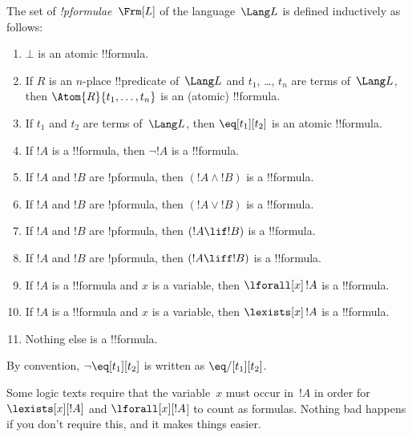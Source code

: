 \documentclass[../../include/open-logic-section]{subfiles}
\begin{document}
\begin{defn}[Formula]
The set of \emph{!p{formulae}}~$\Frm[L]$ of the language~$\Lang L$
is defined inductively as follows:
\begin{enumerate}
\item $\bot$ is an atomic !!{formula}.
\item If $R$ is an $n$-place !!{predicate} of~$\Lang L$ and $t_1$, \dots,
  $t_n$ are terms of~$\Lang L$, then $\Atom{R}{t_1,\ldots, t_n}$ is an
  (atomic) !!{formula}.
\item If $t_1$ and $t_2$ are terms of~$\Lang L$, then $\eq[t_1][t_2]$
  is an atomic !!{formula}.
\item If $!A$ is a !!{formula}, then $\lnot !A$ is a !!{formula}.
\item If $!A$ and $!B$ are !p{formula}, then $(!A \land !B)$ is a !!{formula}.
\item If $!A$ and $!B$ are !p{formula}, then $(!A \lor !B)$ is a !!{formula}.
\item If $!A$ and $!B$ are !p{formula}, then $(!A \lif !B)$ is a !!{formula}.
\item If $!A$ and $!B$ are !p{formula}, then $(!A \liff !B)$ is a !!{formula}.
\item If $!A$ is a !!{formula} and $x$ is a variable, then $\lforall[x]\,
  !A$ is a !!{formula}.
\item If $!A$ is a !!{formula} and $x$ is a variable, then $\lexists[x]\,
  !A$ is a !!{formula}.
\item Nothing else is a !!{formula}.
\end{enumerate}
\end{defn}

\begin{wordy}
By convention, $\lnot \eq[t_1][t_2]$ is written as $\eq/[t_1][t_2]$.
\end{wordy}

\begin{intro}
Some logic texts require that the variable~$x$ must occur in~$!A$ in
order for $\lexists[x][!A]$ and $\lforall[x][!A$] to count as
formulas.  Nothing bad happens if you don't require this, and it makes
things easier.
\end{intro}
\end{document}
